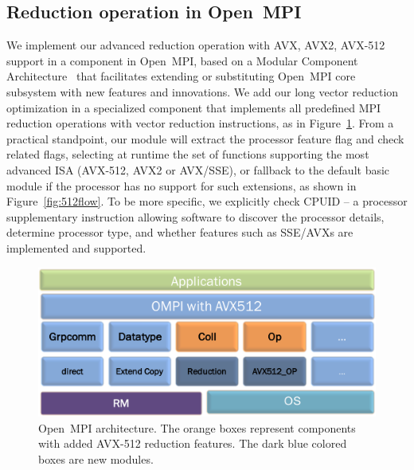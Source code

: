 \documentclass[5p,times,twocolumn]{elsarticle}
\newcommand{\ompi}[0]{Open~MPI\xspace}
\begin{document}
\subsection{Reduction operation in \ompi}
We implement our advanced reduction operation with AVX, AVX2, AVX-512
support in a component in \ompi, based on a Modular Component
Architecture~\cite{dongprrte} that facilitates extending or
substituting \ompi core subsystem with new features and innovations.
We add our long vector reduction optimization in a specialized component that
implements all predefined MPI reduction operations with vector
reduction instructions, as in Figure~\ref{fig:avxmca}. From a
practical standpoint, our module will extract the processor
feature flag and check related flags, selecting at runtime the set of
functions supporting the most advanced ISA (AVX-512, AVX2 or AVX/SSE),
or fallback to the default basic module if the processor has no
support for such extensions, as shown in Figure~\ref{fig:512flow}.
%
To be more specific, we explicitly check CPUID -- a processor
supplementary instruction allowing software to discover the
processor details, determine processor type, and whether features such as
SSE/AVXs are implemented and supported.

\begin{figure}[h]
    \centering
    \includegraphics[width=\linewidth]{avx-mca.pdf}
    \caption{\ompi architecture. The orange boxes represent components with added AVX-512 reduction features. The dark blue colored boxes are new modules.}
    \label{fig:avxmca}
\end{figure}
\end{document}
